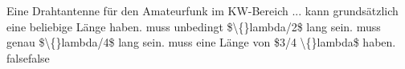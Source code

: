     {Eine Drahtantenne für den Amateurfunk im KW-Bereich ...}
    {kann grundsätzlich eine beliebige Länge haben.}
    {muss unbedingt \$\textbackslash\{\}lambda/2\$ lang sein.}
    {muss genau \$\textbackslash\{\}lambda/4\$ lang sein.}
    {muss eine Länge von \$3/4 \textbackslash\{\}lambda\$  haben.}
    {false}{false}